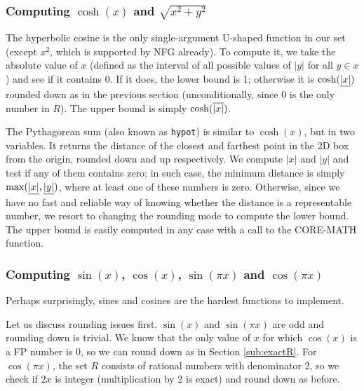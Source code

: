 \subsubsection{Computing $\cosh(x)$ and $\sqrt{x^2+y^2}$}
The hyperbolic cosine is the only single-argument U-shaped function in our set (except $x^2$, which is supported by NFG already). 
To compute it, we take the absolute value of $x$ (defined as the interval of all possible values of $|y|$ for all $y\in x$) and see if it contains 0. 
If it does, the lower bound is 1; otherwise it is $\cosh(\underline{|x|})$ rounded down as in the previous section (unconditionally, since 0 is the only number in $R$). The upper bound is simply $\cosh(\overline{|x|})$.

The Pythagorean sum (also known as \texttt{hypot}) is similar to $\cosh(x)$, but in two variables. It returns the distance of the closest and farthest point in the 2D box from the origin, rounded down and up respectively.
We compute $|x|$ and $|y|$ and test if any of them contains zero; in such case, the minimum distance is simply $\max(\underline{|x|}, \underline{|y|})$, where at least one of these numbers is zero.
Otherwise, since we have no fast and reliable way of knowing whether the distance is a representable number, we resort to changing the rounding mode to compute the lower bound.
The upper bound is easily computed in any case with a call to the CORE-MATH function.

\subsubsection{Computing $\sin(x)$, $\cos(x)$, $\sin(\pi x)$ and $\cos(\pi x)$}
\label{sub:sincos}
Perhaps surprisingly, sines and cosines are the hardest functions to implement.

Let us discuss rounding issues first. $\sin(x)$ and $\sin(\pi x)$ are odd and rounding down is trivial.
We know that the only value of $x$ for which $\cos(x)$ is a FP number is $0$, so we can round down as in Section \ref{sub:exactR}. 
For $\cos(\pi x)$, the set $R$ consists of rational numbers with denominator 2, so we check if $2x$ is integer (multiplication by 2 is exact) and round down as before.

